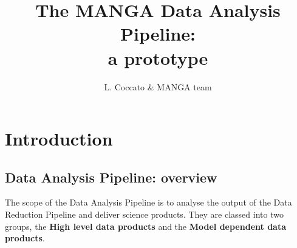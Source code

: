 \documentclass[11pt]{book}
\newcommand{\kms}{km s$^{-1}$}
\begin{document}
\begin{titlepage}
\title{{\Huge The MANGA Data Analysis Pipeline: \\
a prototype}}
\author{L. Coccato \& MANGA team}
\end{titlepage}

\maketitle
\tableofcontents

%
%
%
%
%
%
%
%




\chapter{Introduction}
\label{dap_chap:introduction}

\section{Data Analysis Pipeline: overview}
\label{dap_sec:dap_overview}

The scope of the Data Analysis Pipeline is to analyse the output of
the Data Reduction Pipeline and deliver science products. They are
classed into two groups, the {\bf High level data products} and the
{\bf Model dependent data products}.
\end{document}
